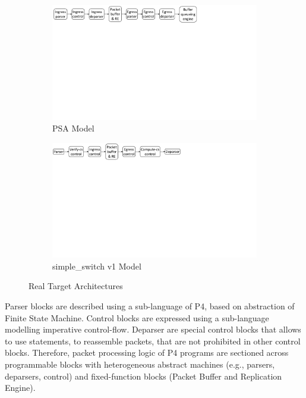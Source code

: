 \documentclass[10pt,sigconf,letterpaper,anonymous]{acmart}
\begin{document}
\begin{figure}
    \begin{subfigure}{\linewidth}
        \centering
        \includegraphics[trim=7 450 281 0, clip,scale=0.36]{psa-pipeline.pdf}
        \caption{PSA Model}
        \label{subfig:psa-model}
    \end{subfigure}
    \begin{subfigure}[b]{\linewidth}
        \centering
        \includegraphics[trim=3 460 357 0, clip,scale=0.35]{v1model-pipeline.pdf}
        \caption{simple\_switch v1 Model}
        \label{subfig:v1model}
    \end{subfigure}
\caption{Real Target Architectures}
\label{fig:real-target-architectures}
\end{figure}



Parser blocks are described using a sub-language of P4, based on abstraction of Finite State Machine.
Control blocks are expressed using a sub-language modelling imperative control-flow.
Deparser are special control blocks that allows to use statements, to reassemble packets, that are not prohibited in other control blocks.
Therefore, packet processing logic of P4 programs are sectioned across programmable blocks with heterogeneous abstract machines (e.g., parsers, deparsers, control) and fixed-function blocks (Packet Buffer and Replication Engine).
\end{document}
